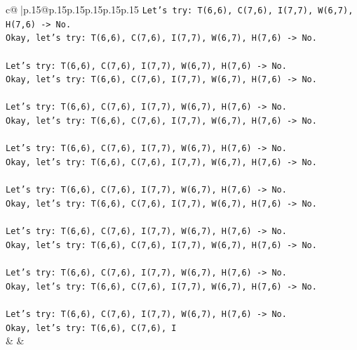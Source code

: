 \documentclass{article}
\begin{document}
{\begin{supertabular}{c@{$\;$}|p{.15\linewidth}@{}p{.15\linewidth}p{.15\linewidth}p{.15\linewidth}p{.15\linewidth}p{.15\linewidth}}
{{{\texttt{Let's try: T(6,6), C(7,6), I(7,7), W(6,7), H(7,6) {-}> No.} \\
\texttt{Okay, let's try: T(6,6), C(7,6), I(7,7), W(6,7), H(7,6) {-}> No.} \\
\\ 
\texttt{Let's try: T(6,6), C(7,6), I(7,7), W(6,7), H(7,6) {-}> No.} \\
\texttt{Okay, let's try: T(6,6), C(7,6), I(7,7), W(6,7), H(7,6) {-}> No.} \\
\\ 
\texttt{Let's try: T(6,6), C(7,6), I(7,7), W(6,7), H(7,6) {-}> No.} \\
\texttt{Okay, let's try: T(6,6), C(7,6), I(7,7), W(6,7), H(7,6) {-}> No.} \\
\\ 
\texttt{Let's try: T(6,6), C(7,6), I(7,7), W(6,7), H(7,6) {-}> No.} \\
\texttt{Okay, let's try: T(6,6), C(7,6), I(7,7), W(6,7), H(7,6) {-}> No.} \\
\\ 
\texttt{Let's try: T(6,6), C(7,6), I(7,7), W(6,7), H(7,6) {-}> No.} \\
\texttt{Okay, let's try: T(6,6), C(7,6), I(7,7), W(6,7), H(7,6) {-}> No.} \\
\\ 
\texttt{Let's try: T(6,6), C(7,6), I(7,7), W(6,7), H(7,6) {-}> No.} \\
\texttt{Okay, let's try: T(6,6), C(7,6), I(7,7), W(6,7), H(7,6) {-}> No.} \\
\\ 
\texttt{Let's try: T(6,6), C(7,6), I(7,7), W(6,7), H(7,6) {-}> No.} \\
\texttt{Okay, let's try: T(6,6), C(7,6), I(7,7), W(6,7), H(7,6) {-}> No.} \\
\\ 
\texttt{Let's try: T(6,6), C(7,6), I(7,7), W(6,7), H(7,6) {-}> No.} \\
\texttt{Okay, let's try: T(6,6), C(7,6), I} \\
            }
        }
    }
    & & \\ \\


\end{supertabular}}
\end{document}
